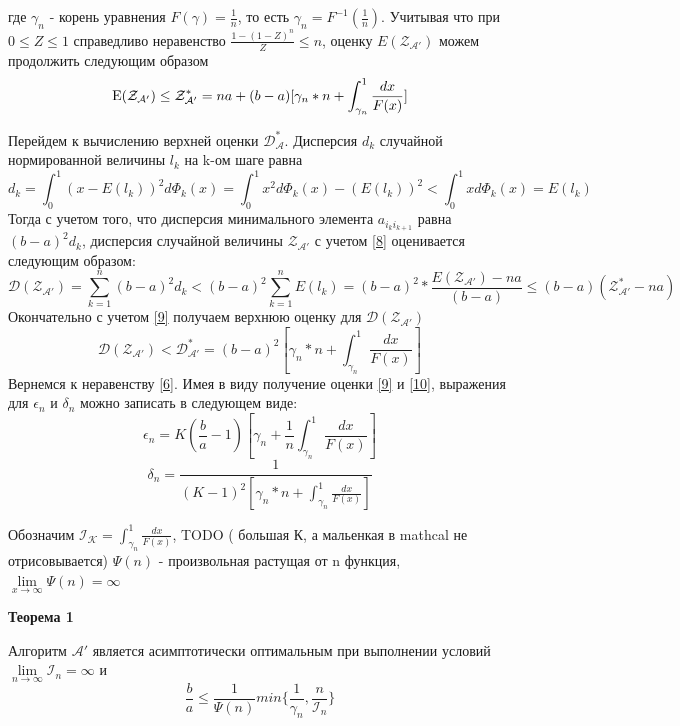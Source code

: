 \documentclass[a4paper, 14pt]{extarticle}
\begin{document}
где $\gamma_n$ - корень уравнения $F(\gamma) = \frac{1}{n}$, то есть $\gamma_n = F^{-1}(\frac{1}{n})$. Учитывая что при $0 \leq Z \leq 1$ справедливо неравенство $\frac{1-(1-Z)^n}{Z} \leq n$, оценку $E( {\mathcal{Z_{A'}}})$ можем продолжить следующим образом
\begin{equation}\label{9}
\text{E($\mathcal{Z_{A'}}$)} \leq \text{$\mathcal{Z^*_{A'}}$} = na+(b-a)[\gamma_n * n+ \int_{\gamma_n}^1 \frac{dx}{F(x)}]
\end{equation}

Перейдем к вычислению верхней оценки $\mathcal{D_A^{*}}$. Дисперсия $d_k$ случайной нормированной величины $l_k$ на k-ом шаге равна
\begin{equation}
d_k=\int_0^1 (x-E(l_k))^2 d \Phi_k(x) = \int_0^1 x^2 d \Phi_k(x)- (E(l_k))^2 < \int_0^1 x d \Phi_k(x) = E(l_k)
\end{equation}
Тогда с учетом того, что дисперсия минимального элемента $a_{i_k i_{k+1}}$ равна $(b-a)^2 d_k$, дисперсия случайной величины ${\mathcal{Z_{A'}}}$ с учетом \ref{8} оценивается следующим образом:
\begin{equation}
\mathcal{D(\mathcal{Z_{A'}})} = \sum_{k=1}^n (b-a)^2 d_k < (b-a)^2 \sum_{k=1}^n E(l_k) = (b-a)^2 * \frac{E(\mathcal{Z_{A'}})-na}{(b-a)} \leq (b-a)(\mathcal{Z_{A'}^*}-na)
\end{equation}
Окончательно с учетом \ref{9} получаем верхнюю оценку для $\mathcal{D(\mathcal{Z_{A'}})}$
\begin{equation}\label{10}
\mathcal{D(\mathcal{Z_{A'}})} < \mathcal{D_{A'}^*} = (b-a)^2 [\gamma_n*n+\int_{\gamma_n}^1 \frac{dx}{F(x)}]
\end{equation}
Вернемся к неравенству \ref{6}. Имея в виду получение оценки \ref{9} и \ref{10}, выражения для $\epsilon_n$ и $\delta_n$ можно записать в следующем виде: 
\begin{equation}
\epsilon_n = K(\frac{b}{a}-1)[\gamma_n + \frac{1}{n} \int_{\gamma_n}^1 \frac{dx}{F(x)}]
\end{equation}
\begin{equation}
\delta_n = \frac{1}{(K-1)^2 [\gamma_n * n + \int_{\gamma_n}^1 \frac{dx}{F(x)}]}
\end{equation}

Обозначим $\mathcal{I_K} = \int_{\gamma_n}^1 \frac{dx}{F(x)}$, TODO ( большая К, а мальенкая в mathcal не отрисовывается) $\Psi(n)$ - произвольная растущая от n функция, $\lim\limits_{x\to \infty} \Psi(n) = \infty $ 

\textbf{Теорема 1}

Алгоритм $\mathcal{A'}$ является асимптотически оптимальным при выполнении условий $\lim\limits_{{n} \to \infty} \mathcal{I}_n = \infty $ и 
\begin{equation}
\frac{b}{a} \leq \frac{1}{\Psi(n)} min \{ \frac{1}{\gamma_n}, \frac{n}{\mathcal{I}_n} \}
\end{equation}
\end{document}
